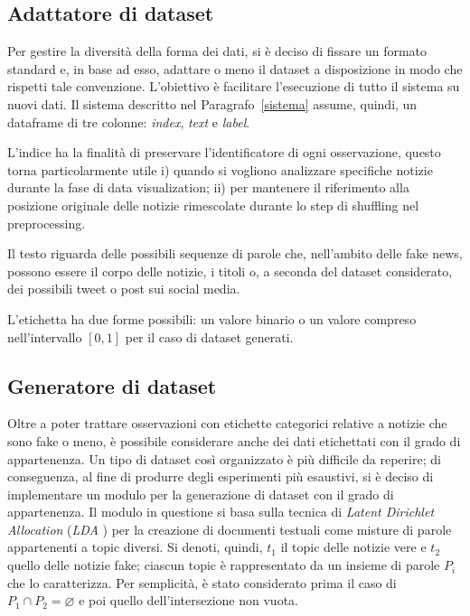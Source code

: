 \documentclass[12pt]{report}
\theoremstyle{definition}
\let\emptyset\varnothing
\begin{document}
\subsection{Adattatore di dataset}\label{adapter}
Per gestire la diversità della forma dei dati, si è deciso di fissare un formato standard e, in base ad esso, adattare o meno il dataset a disposizione in modo che rispetti tale convenzione. L'obiettivo è facilitare l'esecuzione di tutto il sistema su nuovi dati.
Il sistema descritto nel Paragrafo~\ref{sistema} assume, quindi, un dataframe di tre colonne: \textit{index}, \textit{text} e \textit{label}.

L'indice ha la finalità di preservare l'identificatore di ogni osservazione, questo torna particolarmente utile i) quando si vogliono analizzare specifiche notizie durante la fase di data visualization; ii) per mantenere il riferimento alla posizione originale delle notizie rimescolate durante lo step di shuffling nel preprocessing.

Il testo riguarda delle possibili sequenze di parole che, nell'ambito delle fake news, possono essere il corpo delle notizie, i titoli o, a seconda del dataset considerato, dei possibili tweet o post sui social media.

L'etichetta ha due forme possibili: un valore binario o un valore compreso nell'intervallo $[0,1]$ per il caso di dataset generati.

\subsection{Generatore di dataset}\label{generator}
Oltre a poter trattare osservazioni con etichette categorici relative a notizie che sono fake o meno, è possibile considerare anche dei dati etichettati con il grado di appartenenza. Un tipo di dataset così organizzato è più difficile da reperire; di conseguenza, al fine di produrre degli esperimenti più esaustivi, si è deciso di implementare un modulo per la generazione di dataset con il grado di appartenenza. Il modulo in questione si basa sulla tecnica di \textit{Latent Dirichlet Allocation} (\textit{LDA} \cite{20}) per la creazione di documenti testuali come misture di parole appartenenti a topic diversi. 
Si denoti, quindi, $t_1$ il topic delle notizie vere e $t_2$ quello delle notizie fake; ciascun topic è rappresentato da un insieme di parole $P_i$ che lo caratterizza. Per semplicità, è stato considerato prima il caso di $P_1 \cap P_2 = \emptyset$ e poi quello dell'intersezione non vuota.
\end{document}
